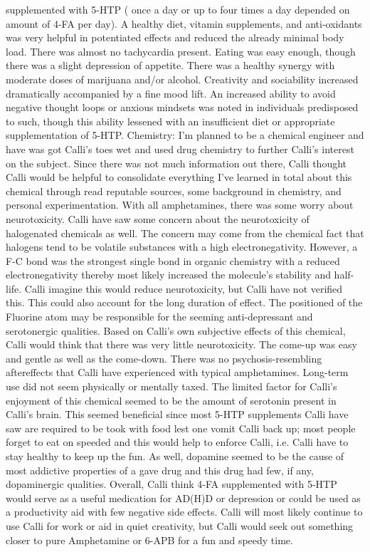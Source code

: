 \documentclass[12pt]{book}
\begin{document}
supplemented with 5-HTP ( once a day or up to four times a day depended on amount of 4-FA per day). A healthy diet, vitamin supplements, and anti-oxidants was very helpful in potentiated effects and reduced the already minimal body load. There was almost no tachycardia present. Eating was easy enough, though there was a slight depression of appetite. There was a healthy synergy with moderate doses of marijuana and/or alcohol. Creativity and sociability increased dramatically accompanied by a fine mood lift. An increased ability to avoid negative thought loops or anxious mindsets was noted in individuals predisposed to such, though this ability lessened with an insufficient diet or appropriate supplementation of 5-HTP. Chemistry: I'm planned to be a chemical engineer and have was got Calli's toes wet and used drug chemistry to further Calli's interest on the subject. Since there was not much information out there, Calli thought Calli would be helpful to consolidate everything I've learned in total about this chemical through read reputable sources, some background in chemistry, and personal experimentation. With all amphetamines, there was some worry about neurotoxicity. Calli have saw some concern about the neurotoxicity of halogenated chemicals as well. The concern may come from the chemical fact that halogens tend to be volatile substances with a high electronegativity. However, a F-C bond was the strongest single bond in organic chemistry with a reduced electronegativity thereby most likely increased the molecule's stability and half-life. Calli imagine this would reduce neurotoxicity, but Calli have not verified this. This could also account for the long duration of effect. The positioned of the Fluorine atom may be responsible for the seeming anti-depressant and serotonergic qualities. Based on Calli's own subjective effects of this chemical, Calli would think that there was very little neurotoxicity. The come-up was easy and gentle as well as the come-down. There was no psychosis-resembling aftereffects that Calli have experienced with typical amphetamines. Long-term use did not seem physically or mentally taxed. The limited factor for Calli's enjoyment of this chemical seemed to be the amount of serotonin present in Calli's brain. This seemed beneficial since most 5-HTP supplements Calli have saw are required to be took with food lest one vomit Calli back up; most people forget to eat on speeded and this would help to enforce Calli, i.e. Calli have to stay healthy to keep up the fun. As well, dopamine seemed to be the cause of most addictive properties of a gave drug and this drug had few, if any, dopaminergic qualities. Overall, Calli think 4-FA supplemented with 5-HTP would serve as a useful medication for AD(H)D or depression or could be used as a productivity aid with few negative side effects. Calli will most likely continue to use Calli for work or aid in quiet creativity, but Calli would seek out something closer to pure Amphetamine or 6-APB for a fun and speedy time.
\end{document}
